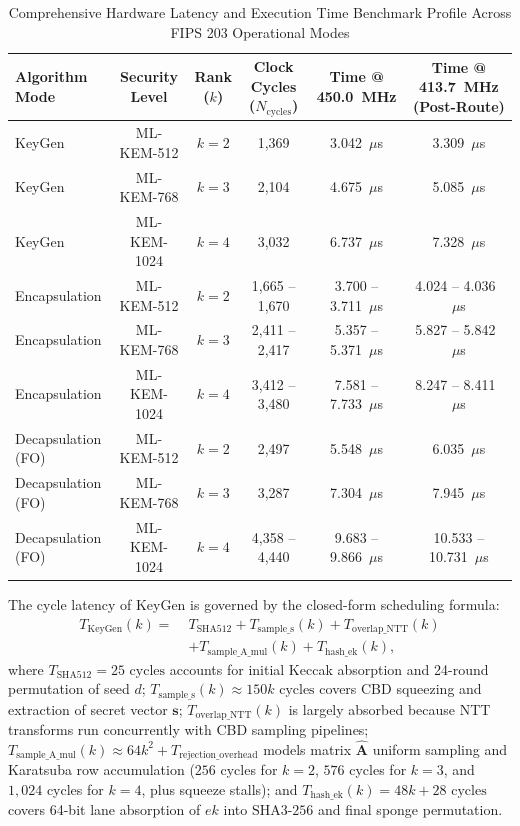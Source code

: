 \begin{table}[!t]
\caption{Comprehensive Hardware Latency and Execution Time Benchmark Profile Across FIPS 203 Operational Modes}
\label{tab:latency_profile}
\centering
\footnotesize
\begin{tabular}{@{} l c c c c c @{}}
\toprule
\textbf{Algorithm Mode} & \textbf{Security Level} & \textbf{Rank ($k$)} & \textbf{Clock Cycles ($N_{\text{cycles}}$)} & \textbf{Time @ 450.0~MHz} & \textbf{Time @ 413.7~MHz (Post-Route)} \\
\midrule
KeyGen & ML-KEM-512 & $k = 2$ & 1,369 & 3.042~$\mu$s & 3.309~$\mu$s \\
KeyGen & ML-KEM-768 & $k = 3$ & 2,104 & 4.675~$\mu$s & 5.085~$\mu$s \\
KeyGen & ML-KEM-1024 & $k = 4$ & 3,032 & 6.737~$\mu$s & 7.328~$\mu$s \\
\midrule
Encapsulation & ML-KEM-512 & $k = 2$ & 1,665 -- 1,670 & 3.700 -- 3.711~$\mu$s & 4.024 -- 4.036~$\mu$s \\
Encapsulation & ML-KEM-768 & $k = 3$ & 2,411 -- 2,417 & 5.357 -- 5.371~$\mu$s & 5.827 -- 5.842~$\mu$s \\
Encapsulation & ML-KEM-1024 & $k = 4$ & 3,412 -- 3,480 & 7.581 -- 7.733~$\mu$s & 8.247 -- 8.411~$\mu$s \\
\midrule
Decapsulation (FO) & ML-KEM-512 & $k = 2$ & 2,497 & 5.548~$\mu$s & 6.035~$\mu$s \\
Decapsulation (FO) & ML-KEM-768 & $k = 3$ & 3,287 & 7.304~$\mu$s & 7.945~$\mu$s \\
Decapsulation (FO) & ML-KEM-1024 & $k = 4$ & 4,358 -- 4,440 & 9.683 -- 9.866~$\mu$s & 10.533 -- 10.731~$\mu$s \\
\bottomrule
\end{tabular}
\end{table}

The cycle latency of KeyGen is governed by the closed-form scheduling formula:
\begin{equation}
\label{eq:keygen_latency}
\begin{aligned}
T_{\text{KeyGen}}(k) = \; &T_{\text{SHA512}} + T_{\text{sample\_s}}(k) + T_{\text{overlap\_NTT}}(k) \\
&+ T_{\text{sample\_A\_mul}}(k) + T_{\text{hash\_ek}}(k),
\end{aligned}
\end{equation}
where $T_{\text{SHA512}} = 25\text{ cycles}$ accounts for initial Keccak absorption and 24-round permutation of seed $d$; $T_{\text{sample\_s}}(k) \approx 150k\text{ cycles}$ covers CBD squeezing and extraction of secret vector $\mathbf{s}$; $T_{\text{overlap\_NTT}}(k)$ is largely absorbed because NTT transforms run concurrently with CBD sampling pipelines; $T_{\text{sample\_A\_mul}}(k) \approx 64k^2 + T_{\text{rejection\_overhead}}$ models matrix $\hat{\mathbf{A}}$ uniform sampling and Karatsuba row accumulation ($256$ cycles for $k=2$, $576$ cycles for $k=3$, and $1,024$ cycles for $k=4$, plus squeeze stalls); and $T_{\text{hash\_ek}}(k) = 48k + 28\text{ cycles}$ covers 64-bit lane absorption of $ek$ into $\text{SHA3-256}$ and final sponge permutation.

